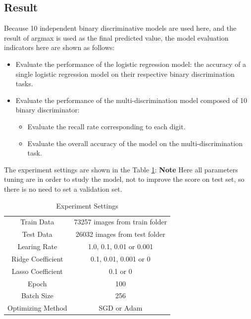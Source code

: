 \documentclass{article}
\begin{document}
\subsection{Result}
Because 10 independent binary discriminative models are used here, and the result of argmax is used as the final predicted value, the model evaluation indicators here are shown as follows:
\begin{itemize}
    \item Evaluate the performance of the logistic regression model: the accuracy of a single logistic regression model on their respective binary discrimination tasks.
    \item Evaluate the performance of the multi-discrimination model composed of 10 binary discriminator: 
    \begin{itemize}
        \item Evaluate the recall rate corresponding to each digit.
        \item Evaluate the overall accuracy of the model on the multi-discrimination task.
    \end{itemize}
\end{itemize}
The experiment settings are shown in the Table \ref{setting}: \textbf{Note} Here all parameters tuning are in order to study the model, not to improve the score on test set, so there is no need to set a validation set.
\begin{table}[H]
    \centering
    \caption{Experiment Settings}
    \label{setting}
    \begin{tabular}{|c|c|}
        \hline
        Train Data & 73257 images from train folder\\
        Test Data & 26032 images from test folder\\
        Learing Rate & 1.0, 0.1, 0.01 or 0.001\\
        Ridge Coefficient & 0.1, 0.01, 0.001 or 0\\
        Lasso Coefficient & 0.1 or 0\\
        Epoch & 100\\
        Batch Size & 256\\
        Optimizing Method& SGD or Adam\\
        \hline
    \end{tabular}
\end{table}
\end{document}
